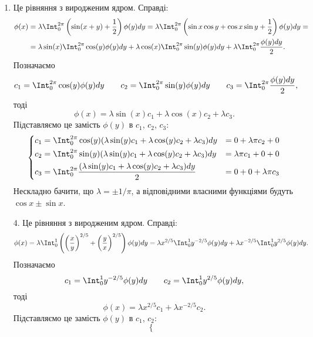 \begin{solution}
    \begin{enumerate}
        \item Це рівняння з виродженим ядром. Справді: 
        \begin{equation*}\begin{split}
            \phi(x) &= \lambda \Int_0^{2\pi} \left(\sin(x+y)+\dfrac12\right)\phi(y)dy = \lambda \Int_0^{2\pi} \left(\sin x\cos y+\cos x\sin y+\dfrac12\right)\phi(y)dy = \\
            &= \lambda \sin(x)\Int_0^{2\pi} \cos(y)\phi(y)dy + \lambda \cos(x)\Int_0^{2\pi} \sin(y)\phi(y)dy + \lambda \Int_0^{2\pi} \dfrac{\phi(y) dy}{2}.
        \end{split}\end{equation*}
        Позначаємо 
        \[ c_1 = \Int_0^{2\pi} \cos(y)\phi(y)dy \qquad c_2 = \Int_0^{2\pi} \sin(y)\phi(y)dy \qquad c_3 = \Int_0^{2\pi} \dfrac{\phi(y) dy}{2},\]
        тоді 
        \[ \phi(x) = \lambda \sin(x) c_1 + \lambda \cos(x) c_2 + \lambda c_3.\]
        Підставляємо це замість $\phi(y)$ в $c_1$, $c_2$, $c_3$:
        \begin{equation*}\left\{\begin{aligned}
            c_1 &= \Int_0^{2\pi} \cos(y)(\lambda \sin(y) c_1 + \lambda \cos(y) c_2 + \lambda c_3) dy &= 0 + \lambda\pi c_2 + 0 \\ 
            c_2 &= \Int_0^{2\pi} \sin(y)(\lambda \sin(y) c_1 + \lambda \cos(y) c_2 + \lambda c_3) dy &= \lambda\pi c_1 + 0 + 0 \\
            c_3 &= \Int_0^{2\pi} \dfrac{(\lambda \sin(y) c_1 + \lambda \cos(y) c_2 + \lambda c_3) dy}{2} &= 0 + 0 + \lambda \pi c_3
        \end{aligned}\right.\end{equation*}
        Нескладно бачити, що $\lambda=\pm1/\pi$, а відповідними власними функціями будуть $\cos x\pm \sin x$.
        \item[4.] Це рівняння з виродженим ядром. Справді: 
        \[ \phi(x) = \lambda \Int_0^1 \left(\left(\dfrac xy\right)^{2/5}+\bigg(\dfrac yx\bigg)^{2/5}\right)\phi(y)dy = \lambda x^{2/5}\Int_0^1 y^{-2/5}\phi(y) dy + \lambda x^{-2/5}\Int_0^1 y^{2/5}\phi(y)dy. \]
        Позначаємо
        \[c_1 = \Int_0^1 y^{-2/5}\phi(y) dy \qquad c_2 = \Int_0^1 y^{2/5}\phi(y) dy,\]
        тоді
        \[\phi(x) = \lambda x^{2/5} c_1 + \lambda x^{-2/5} c_2.\]
        Підставляємо це замість $\phi(y)$ в $c_1$, $c_2$:
        \begin{equation*}\left\{\begin{aligned}

\end{aligned}
\end{equation*}
\end{enumerate}
\end{solution}
